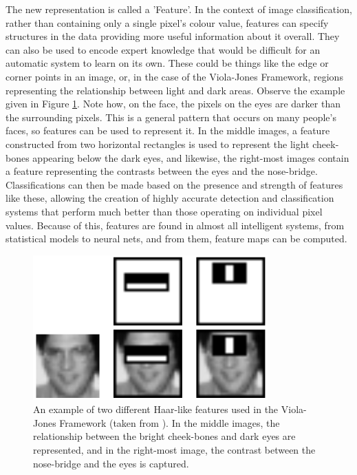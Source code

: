 \documentclass[11pt,a4paper,oldfontcommands]{memoir}
\begin{document}
The new representation is called a 'Feature'. In the context of image classification, rather than containing only a single pixel's colour value, features can specify structures in the data providing more useful information about it overall. They can also be used to encode expert knowledge that would be difficult for an automatic system to learn on its own. These could be things like the edge or corner points in an image, or, in the case of the Viola-Jones Framework, regions representing the relationship between light and dark areas. Observe the example given in Figure \ref{fig:vj_feature_example}. Note how, on the face, the pixels on the eyes are darker than the surrounding pixels. This is a general pattern that occurs on many people's faces, so features can be used to represent it. In the middle images, a feature constructed from two horizontal rectangles is used to represent the light cheek-bones appearing below the dark eyes, and likewise, the right-most images contain a feature representing the contrasts between the eyes and the nose-bridge. Classifications can then be made based on the presence and strength of features like these, allowing the creation of highly accurate detection and classification systems that perform much better than those operating on individual pixel values. Because of this, features are found in almost all intelligent systems, from statistical models to neural nets, and from them, feature maps can be computed.

\begin{figure}
    \centering
    \includegraphics[height=15em]{Images/vj_feature_example.png}
    \caption{An example of two different Haar-like features used in the Viola-Jones Framework (taken from \cite{viola}). In the middle images, the relationship between the bright cheek-bones and dark eyes are represented, and in the right-most image, the contrast between the nose-bridge and the eyes is captured.}
    \label{fig:vj_feature_example}
\end{figure}
\end{document}
